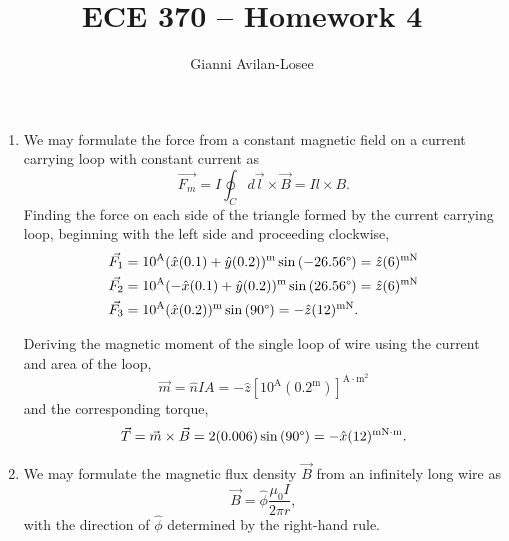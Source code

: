 \documentclass{article}
\title{ECE 370 -- Homework 4}
\author{Gianni Avilan-Losee}
\begin{document}
\begin{enumerate}
	\item We may formulate the force from a constant magnetic field on a current carrying loop with constant current as 
		\[
			\vec{F_m} = I \oint_C d \vec{l} \times \vec{B} = I l \times B.
		\]
		Finding the force on each side of the triangle formed by the current carrying loop, beginning with the left side and proceeding clockwise, 
		\begin{align*}
			&\vec{F_1} = 10^\mathrm{A} (\hat{x}(0.1) + \hat{y}(0.2))^{\mathrm{m}}\sin{(-26.56 \degree)} = \hat{z} (6)^{\mathrm{mN}} \\
			&\vec{F_2} = 10^\mathrm{A} (-\hat{x}(0.1) + \hat{y}(0.2))^{\mathrm{m}}\sin{(26.56 \degree)} = \hat{z}(6)^{\mathrm{mN}} \\
			&\vec{F_3} = 10^\mathrm{A} (\hat{x}(0.2))^{\mathrm{m}} \sin{(90\degree)} = -\hat{z}(12)^{\mathrm{mN}}.
		\end{align*}

		Deriving the magnetic moment of the single loop of wire using the current and area of the loop,
		\[
			\vec{m} = \hat{n}IA = -\hat{z}[10^{\mathrm{A}}(0.2^{\mathrm{m}})]^{\mathrm{A \cdot m^2}}
		\]
		and the corresponding torque,
		\[
			\vec{T} = \vec{m} \times \vec{B} = 2(0.006)\sin{(90\degree)} = -\hat{x}(12)^{\mathrm{mN \cdot m}}.
		\]
	\item We may formulate the magnetic flux density \(\vec{B}\) from an infinitely long wire as 
		\[
		  \vec{B} = \hat{\phi}\frac{\mu_0 I}{2\pi r},
		\]
		with the direction of \(\hat{\phi}\) determined by the right-hand rule.


\end{enumerate}
\end{document}
